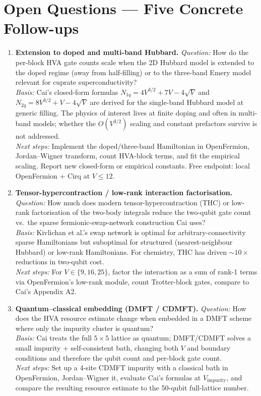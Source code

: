 \section*{Open Questions --- Five Concrete Follow-ups}

\begin{enumerate}

\item \textbf{Extension to doped and multi-band Hubbard.}
\textit{Question:} How do the per-block HVA gate counts scale when the 2D Hubbard model is
extended to the doped regime (away from half-filling) or to the three-band Emery model
relevant for cuprate superconductivity? \\
\textit{Basis:} Cai's closed-form formulas $N_{1q}=4V^{3/2}+7V-4\sqrt{V}$ and
$N_{2q}=8V^{3/2}+V-4\sqrt{V}$ are derived for the single-band Hubbard model at generic
filling. The physics of interest lives at finite doping and often in multi-band models;
whether the $O(V^{3/2})$ scaling and constant prefactors survive is not addressed. \\
\textit{Next steps:} Implement the doped/three-band Hamiltonian in OpenFermion,
Jordan--Wigner transform, count HVA-block terms, and fit the empirical scaling.
Report new closed-form or empirical constants. Free endpoint: local OpenFermion + Cirq
at $V\le 12$.

\item \textbf{Tensor-hypercontraction / low-rank interaction factorisation.}
\textit{Question:} How much does modern tensor-hypercontraction (THC) or low-rank
factorisation of the two-body integrals reduce the two-qubit gate count vs.\ the sparse
fermionic-swap-network construction Cai uses? \\
\textit{Basis:} Kivlichan et al.'s swap network is optimal for arbitrary-connectivity
sparse Hamiltonians but suboptimal for structured (nearest-neighbour Hubbard) or low-rank
Hamiltonians. For chemistry, THC has driven $\sim 10\times$ reductions in two-qubit cost. \\
\textit{Next steps:} For $V\in\{9,16,25\}$, factor the interaction as a sum of rank-1
terms via OpenFermion's low-rank module, count Trotter-block gates, compare to Cai's
Appendix A2.

\item \textbf{Quantum--classical embedding (DMFT / CDMFT).}
\textit{Question:} How does the HVA resource estimate change when embedded in a DMFT
scheme where only the impurity cluster is quantum? \\
\textit{Basis:} Cai treats the full $5\times 5$ lattice as quantum; DMFT/CDMFT solves a
small impurity + self-consistent bath, changing both $V$ and boundary conditions and
therefore the qubit count and per-block gate count. \\
\textit{Next steps:} Set up a 4-site CDMFT impurity with a classical bath in OpenFermion,
Jordan--Wigner it, evaluate Cai's formulas at $V_{\mathrm{impurity}}$, and compare the
resulting resource estimate to the 50-qubit full-lattice number.


\end{enumerate}
